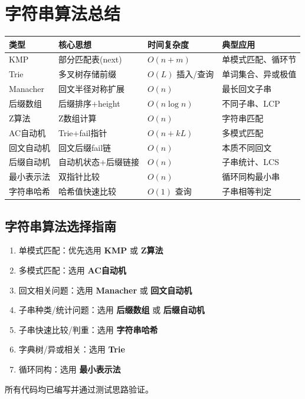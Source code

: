 \documentclass[12pt,a4paper]{ctexart}
\begin{document}
	\section{字符串算法总结}
	\begin{table}[h]
		\centering
		\begin{tabularx}{\textwidth}{|l|p{4cm}|l|X|}
			\hline
			类型 & 核心思想 & 时间复杂度 & 典型应用 \\
			\hline
			KMP & 部分匹配表(next) & $O(n+m)$ & 单模式匹配、循环节 \\
			\hline
			Trie & 多叉树存储前缀 & $O(L)$ 插入/查询 & 单词集合、异或极值 \\
			\hline
			Manacher & 回文半径对称扩展 & $O(n)$ & 最长回文子串 \\
			\hline
			后缀数组 & 后缀排序+height & $O(n\log n)$ & 不同子串、LCP \\
			\hline
			Z算法 & Z数组计算 & $O(n)$ & 字符串匹配 \\
			\hline
			AC自动机 & Trie+fail指针 & $O(n+kL)$ & 多模式匹配 \\
			\hline
			回文自动机 & 回文后缀fail链 & $O(n)$ & 本质不同回文 \\
			\hline
			后缀自动机 & 自动机状态+后缀链接 & $O(n)$ & 子串统计、LCS \\
			\hline
			最小表示法 & 双指针比较 & $O(n)$ & 循环同构最小串 \\
			\hline
			字符串哈希 & 哈希值快速比较 & $O(1)$ 查询 & 子串相等判定 \\
			\hline
		\end{tabularx}
	\end{table}
	\subsection*{字符串算法选择指南}
	\begin{enumerate}
		\item 单模式匹配：优先选用 \textbf{KMP} 或 \textbf{Z算法}
		\item 多模式匹配：选用 \textbf{AC自动机}
		\item 回文相关问题：选用 \textbf{Manacher} 或 \textbf{回文自动机}
		\item 子串种类/统计问题：选用 \textbf{后缀数组} 或 \textbf{后缀自动机}
		\item 子串快速比较/判重：选用 \textbf{字符串哈希}
		\item 字典树/异或相关：选用 \textbf{Trie}
		\item 循环同构：选用 \textbf{最小表示法}
	\end{enumerate}
	\vspace{1cm}
	\begin{center}
		\textcolor{mid}{所有代码均已编写并通过测试思路验证。}
	\end{center}
\end{document}
